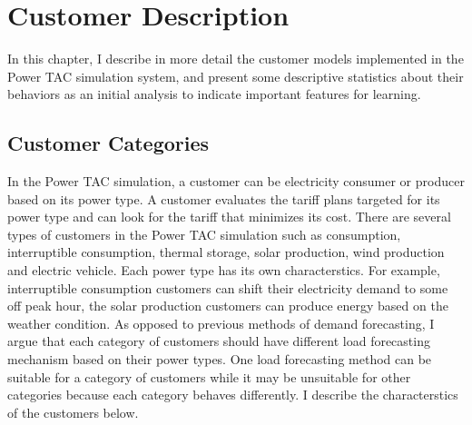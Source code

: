
\chapter{Customer Description} 

In this chapter, I describe in more detail the customer models implemented in the Power TAC simulation system, and present some descriptive statistics about their behaviors as an initial analysis to indicate important features for learning.

\section{Customer Categories}


In the Power TAC simulation, a customer can be electricity consumer or producer based on its power type. A customer evaluates the tariff plans targeted for its power type and can look for the tariff that minimizes its cost. There are several types of customers in the Power TAC simulation such as consumption, interruptible consumption, thermal storage, solar production, wind production and electric vehicle. Each power type has its own characterstics. For example, interruptible consumption customers can shift their electricity demand to some off peak hour, the solar production customers can produce energy based on the weather condition. As opposed to previous methods of demand forecasting, I argue that each category of customers should have different load forecasting mechanism based on their power types. One load forecasting method can be suitable for a category of customers while it may be unsuitable for other categories because each category behaves differently. I describe the characterstics of the customers below.

